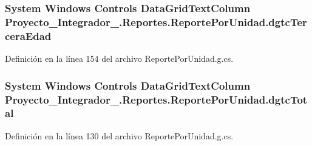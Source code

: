 \hypertarget{class_proyecto___integrador__3_1_1_reportes_1_1_reporte_por_unidad_a717db9d78e9f0644d009266a9b3bb345}{
\subsubsection[{dgtc\-Tercera\-Edad}]{\setlength{\rightskip}{0pt plus 5cm}System Windows Controls Data\-Grid\-Text\-Column Proyecto\-\_\-\-Integrador\-\_.\-Reportes.\-Reporte\-Por\-Unidad.\-dgtc\-Tercera\-Edad\hspace{0.3cm}{\ttfamily [package]}}}\label{class_proyecto___integrador__3_1_1_reportes_1_1_reporte_por_unidad_a717db9d78e9f0644d009266a9b3bb345}


Definición en la línea 154 del archivo Reporte\-Por\-Unidad.\-g.\-cs.

\hypertarget{class_proyecto___integrador__3_1_1_reportes_1_1_reporte_por_unidad_abcccd0f8af50c0d2a94f8ec2030b237f}{
\subsubsection[{dgtc\-Total}]{\setlength{\rightskip}{0pt plus 5cm}System Windows Controls Data\-Grid\-Text\-Column Proyecto\-\_\-\-Integrador\-\_.\-Reportes.\-Reporte\-Por\-Unidad.\-dgtc\-Total\hspace{0.3cm}{\ttfamily [package]}}}\label{class_proyecto___integrador__3_1_1_reportes_1_1_reporte_por_unidad_abcccd0f8af50c0d2a94f8ec2030b237f}


Definición en la línea 130 del archivo Reporte\-Por\-Unidad.\-g.\-cs.

